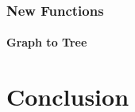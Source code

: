 \documentclass[11pt, a4paper]{report}
\begin{document}
\subsection{New Functions}
\subsubsection{Graph to Tree}


\chapter{Conclusion}


\appendix
\glsaddall
\printglossaries
\end{document}
